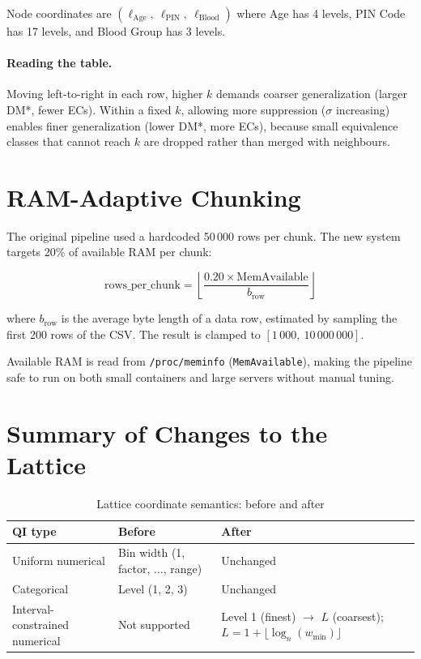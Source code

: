 \documentclass[12pt,a4paper]{article}
\begin{document}
Node coordinates are $(\ell_{\text{Age}},\ \ell_{\text{PIN}},\
\ell_{\text{Blood}})$ where Age has 4 levels, PIN Code has 17 levels,
and Blood Group has 3 levels.

\paragraph{Reading the table.}
Moving left-to-right in each row, higher $k$ demands coarser generalization
(larger DM*, fewer ECs). Within a fixed $k$, allowing more suppression
($\sigma$ increasing) enables finer generalization (lower DM*, more ECs),
because small equivalence classes that cannot reach $k$ are dropped rather
than merged with neighbours.

\section{RAM-Adaptive Chunking}

The original pipeline used a hardcoded 50\,000 rows per chunk. The new
system targets 20\% of available RAM per chunk:

\begin{equation}
  \text{rows\_per\_chunk} =
  \left\lfloor \frac{0.20 \times \text{MemAvailable}}{b_{\text{row}}} \right\rfloor
\end{equation}

where $b_{\text{row}}$ is the average byte length of a data row, estimated by
sampling the first 200 rows of the CSV. The result is clamped to
$[1\,000,\ 10\,000\,000]$.

Available RAM is read from \texttt{/proc/meminfo} (\texttt{MemAvailable}),
making the pipeline safe to run on both small containers and large servers
without manual tuning.

\section{Summary of Changes to the Lattice}

\begin{table}[H]
\centering
\caption{Lattice coordinate semantics: before and after}
\begin{tabular}{lll}
\toprule
QI type & Before & After \\
\midrule
Uniform numerical & Bin width (1, factor, $\ldots$, range) & Unchanged \\
Categorical & Level (1, 2, 3) & Unchanged \\
Interval-constrained numerical & Not supported &
  Level 1 (finest) $\to$ $L$ (coarsest); $L = 1 + \lfloor\log_n(w_{\min})\rfloor$ \\
\bottomrule
\end{tabular}
\end{table}
\end{document}
